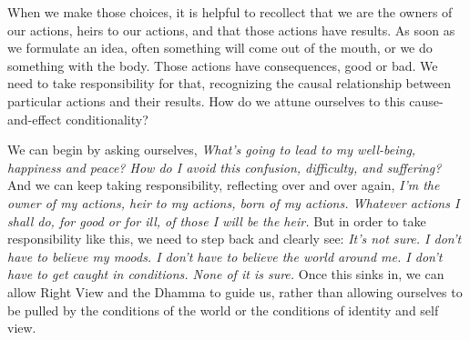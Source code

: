 When we make those choices, it is helpful to recollect that we are the 
owners of our actions, heirs to our actions, and that those actions 
have results. As soon as we formulate an idea, often something will 
come out of the mouth, or we do something with the body. Those actions 
have consequences, good or bad. We need to take responsibility for 
that, recognizing the causal relationship between particular actions 
and their results. How do we attune ourselves to this cause-and-effect 
conditionality?

We can begin by asking ourselves, \emph{What's going to lead to my 
well-being, happiness and peace? How do I avoid this confusion, 
difficulty, and suffering?} And we can keep taking responsibility, 
reflecting over and over again, \emph{I'm the owner of my actions, heir 
to my actions, born of my actions. Whatever actions I shall do, for 
good or for ill, of those I will be the heir.} But in order to take 
responsibility like this, we need to step back and clearly see: 
\emph{It's not sure. I don't have to believe my moods. I don't have to 
believe the world around me. I don't have to get caught in conditions. 
None of it is sure.} Once this sinks in, we can allow Right View and 
the Dhamma to guide us, rather than allowing ourselves to be pulled by 
the conditions of the world or the conditions of identity and self view.

